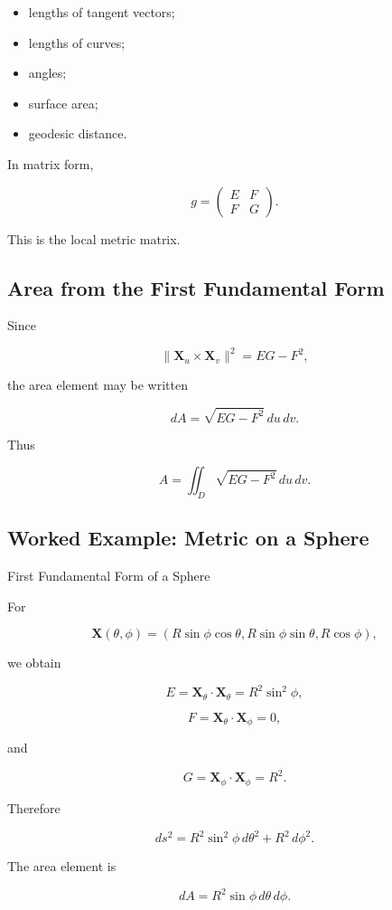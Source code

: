 \begin{itemize}
    \item lengths of tangent vectors;
    \item lengths of curves;
    \item angles;
    \item surface area;
    \item geodesic distance.
\end{itemize}

In matrix form,

\[
\boxed{
g=
\begin{pmatrix}
E&F\\
F&G
\end{pmatrix}.
}
\]

This is the local metric matrix.

\subsection{Area from the First Fundamental Form}
\label{subsec:area-first-form}

Since

\[
\|\mathbf{X}_u\times\mathbf{X}_v\|^2
=
EG-F^2,
\]

the area element may be written

\[
\boxed{
dA
=
\sqrt{EG-F^2}\,du\,dv.
}
\]

Thus

\[
\boxed{
A
=
\iint_D
\sqrt{EG-F^2}\,du\,dv.
}
\]

\subsection{Worked Example: Metric on a Sphere}
\label{subsec:worked-sphere-metric}

\begin{workedexamplebox}{First Fundamental Form of a Sphere}

For

\[
\mathbf{X}(\theta,\phi)
=
\left(
R\sin\phi\cos\theta,
R\sin\phi\sin\theta,
R\cos\phi
\right),
\]

we obtain

\[
E
=
\mathbf{X}_\theta\cdot\mathbf{X}_\theta
=
R^2\sin^2\phi,
\]

\[
F
=
\mathbf{X}_\theta\cdot\mathbf{X}_\phi
=
0,
\]

and

\[
G
=
\mathbf{X}_\phi\cdot\mathbf{X}_\phi
=
R^2.
\]

Therefore

\[
\boxed{
ds^2
=
R^2\sin^2\phi\,d\theta^2
+
R^2\,d\phi^2.
}
\]

The area element is

\[
\boxed{
dA
=
R^2\sin\phi\,d\theta\,d\phi.
}
\]
\end{workedexamplebox}

